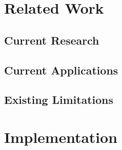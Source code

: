\documentclass[12pt]{article}
\begin{document}
    \section{Related Work}\label{sec:related-work}


    \subsection{Current Research}\label{subsec:current-research}


    \subsection{Current Applications}\label{subsec:current-applications}


    \subsection{Existing Limitations}\label{subsec:existing-limitations}


    \pagebreak


    \section{Implementation}\label{sec:implementation}
\end{document}
